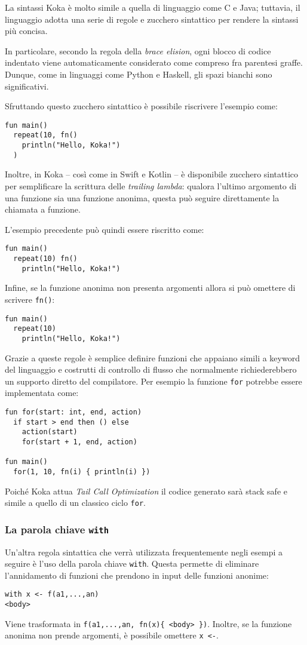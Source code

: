 La sintassi Koka è molto simile a quella di linguaggio come C e Java; tuttavia, il linguaggio adotta una serie di regole e zucchero sintattico per rendere la sintassi più concisa.

In particolare, secondo la regola della \emph{brace elision}, ogni blocco di codice indentato viene automaticamente considerato come compreso fra parentesi graffe. Dunque, come in linguaggi come Python e Haskell, gli spazi bianchi sono significativi.

Sfruttando questo zucchero sintattico è possibile riscrivere l'esempio come:
\begin{lstlisting}[language=koka]
fun main()
  repeat(10, fn()
    println("Hello, Koka!")
  )
\end{lstlisting}

Inoltre, in Koka -- così come in Swift e Kotlin -- è disponibile zucchero sintattico per semplificare la scrittura delle \emph{trailing lambda}: qualora l'ultimo argomento di una funzione sia una funzione anonima, questa può seguire direttamente la chiamata a funzione.

L'esempio precedente può quindi essere riscritto come:
\begin{lstlisting}[language=koka]
fun main()
  repeat(10) fn()
    println("Hello, Koka!")
\end{lstlisting}
Infine, se la funzione anonima non presenta argomenti allora si può omettere di scrivere \lstinline{fn()}:
\begin{lstlisting}[language=koka]
fun main()
  repeat(10)
    println("Hello, Koka!")
\end{lstlisting}
Grazie a queste regole è semplice definire funzioni che appaiano simili a keyword del linguaggio e costrutti di controllo di flusso che normalmente richiederebbero un supporto diretto del compilatore.
Per esempio la funzione \lstinline{for} potrebbe essere implementata come:
\begin{lstlisting}[language=koka]
fun for(start: int, end, action)
  if start > end then () else
    action(start)
    for(start + 1, end, action)

fun main()
  for(1, 10, fn(i) { println(i) })
\end{lstlisting}
Poiché Koka attua \emph{Tail Call Optimization} il codice generato sarà stack safe e simile a quello di un classico ciclo \lstinline{for}.

\subsubsection{La parola chiave \lstinline{with}}
Un'altra regola sintattica che verrà utilizzata frequentemente negli esempi a seguire è l'uso della parola chiave \lstinline{with}. Questa permette di eliminare l'annidamento di funzioni che prendono in input delle funzioni anonime:
\begin{lstlisting}
with x <- f(a1,...,an)
<body>
\end{lstlisting}
Viene trasformata in \lstinline|f(a1,...,an, fn(x){ <body> })|. Inoltre, se la funzione anonima non prende argomenti, è possibile omettere \lstinline{x <-}.

